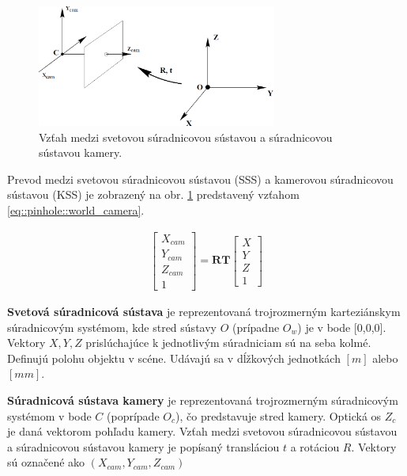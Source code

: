 \begin{figure}[h]
	\centering
	\includegraphics[width=0.7\textwidth]{figures/rotat_translat.jpg} 
	\caption{Vzťah medzi svetovou súradnicovou sústavou a súradnicovou sústavou kamery.}
	\label{fig:rotat_translat}
\end{figure}

Prevod medzi svetovou súradnicovou sústavou (SSS) a kamerovou súradnicovou sústavou (KSS) je zobrazený na obr. \ref{fig:rotat_translat} predstavený vzťahom \ref{eq::pinhole::world_camera}.\newline 

\begin{equation}
\label{eq::pinhole::world_camera}
\begin{aligned}
\begin{bmatrix}
X_{cam} \\ Y_{cam} \\ Z_{cam} \\ 1
\end{bmatrix}=
\boldsymbol{RT}
\begin{bmatrix}
X \\ Y \\ Z \\ 1
\end{bmatrix}
\end{aligned}
\end{equation}

\newpage
\textbf{Svetová súradnicová sústava} je reprezentovaná trojrozmerným karteziánskym súradnicovým systémom, kde stred sústavy $O$ (prípadne $O_w$) je v bode [0,0,0]. Vektory $X,Y,Z$ prislúchajúce k jednotlivým súradniciam sú na seba kolmé. Definujú polohu objektu v scéne. Udávajú sa v dĺžkových jednotkách $[m]$ alebo $[mm]$.\newline 

\textbf{Súradnicová sústava kamery} je reprezentovaná trojrozmerným súradnicovým systémom v bode $C$ (poprípade $O_c$), čo predstavuje stred kamery. Optická os $Z_c$ je daná vektorom pohľadu kamery. Vzťah medzi svetovou súradnicovou sústavou a súradnicovou sústavou kamery je popísaný transláciou $t$ a rotáciou $R$. Vektory sú označené ako $(X_{cam},Y_{cam},Z_{cam})$ \newline 

